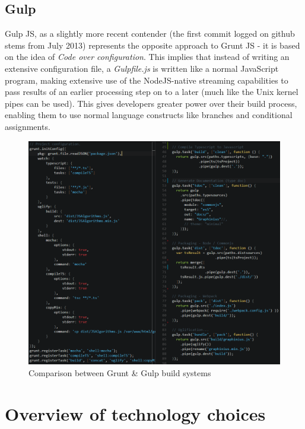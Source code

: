 	\subsection{Gulp}
	\label{ssect:gulp}
	
	Gulp JS, as a slightly more recent contender (the first commit logged on github stems from July 2013) represents the opposite approach to Grunt JS - it is based on the idea of \textit{Code over configuration}. This implies that instead of writing an extensive configuration file, a \textit{Gulpfile.js} is written like a normal JavaScript program, making extensive use of the NodeJS-native streaming capabilities to pass results of an earlier processing step on to a later (much like the Unix kernel pipes can be used). This gives developers greater power over their build process, enabling them to use normal language constructs like branches and conditional assignments.		
	
	\begin{figure}[ht]
		\centering
		\hspace*{-1.1cm}
		\includegraphics[width=1.15\textwidth]{figures/grunt_gulp_comparison}
		\caption{Comparison between Grunt \& Gulp build systems}
		\label{fig:grunt_gulp}
	\end{figure}
	

\section{Overview of technology choices}
\label{sect:design_choices}

